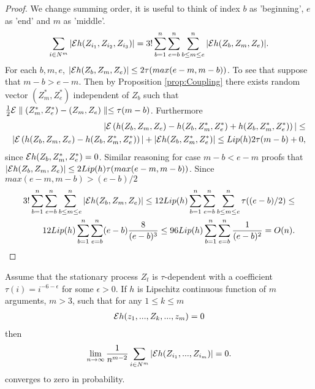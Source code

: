 \begin{proof}
We change summing order, it is useful to think of index $b$ as 'beginning', $e$ as 'end' and $m$ as 'middle'. 
 \begin{align}
 \label{eq:143}
 \sum_{i \in N^{m}} |\mathcal{E}   h(Z_{i_1},Z_{i_2},Z_{i_3})| =  3! \sum_{b=1}^n \sum_{e=b}^n \sum_{b \leq m \leq e }^n |\mathcal{E}   h(Z_b,Z_m,Z_e)|.
\end{align}
For each $b,m,e$, $|\mathcal{E}   h(Z_b,Z_m,Z_e)| \leq 2 \tau(max(e-m,m-b))$. To see that suppose that $m-b>e-m$. Then by Proposition \ref{prop:Coupling} there exists random vector $(Z_m^*,Z_e^*)$ independent of $Z_b$ such that $\frac 1 2 \mathcal{E} \parallel (Z_m^*,Z_e^*) - (Z_m,Z_e) \parallel \leq \tau(m-b)$. Furthermore 
\begin{align}
 |\mathcal{E}   \left(   h(Z_b,Z_m,Z_e) -  h(Z_b,Z_m^*,Z_e^*) + h(Z_b,Z_m^*,Z_e^*) \right) | \leq  \\
 |\mathcal{E}   \left(   h(Z_b,Z_m,Z_e) -  h(Z_b,Z_m^*,Z_e^*) \right) |+ |\mathcal{E} h(Z_b,Z_m^*,Z_e^*) | \leq Lip(h) 2\tau(m-b) +0, 
\end{align}
since $\mathcal{E} h(Z_b,Z_m^*,Z_e^*)=0$. Similar reasoning for case $m-b<e-m$ proofs that $|\mathcal{E} h(Z_b,Z_m,Z_e)| \leq 2 Lip(h) \tau(max(e-m,m-b))$. Since $max(e-m,m-b)>(e-b)/2$   
\begin{align}
3! \sum_{b=1}^n \sum_{e=b}^n \sum_{b \leq m \leq e }^n |\mathcal{E} h(Z_b,Z_m,Z_e)| \leq 12 Lip(h) \sum_{b=1}^n \sum_{e=b}^n \sum_{b \leq m \leq e }^n \tau((e-b)/2) \leq  \\ 
12 Lip(h) \sum_{b=1}^n \sum_{e=b}^n (e-b) \frac{8} {(e-b)^3} \leq 96 Lip(h) \sum_{b=1}^n \sum_{e=b}^n \frac{1} {(e-b)^2} = O(n).
\end{align}
\end{proof}


\begin{lemma}
\label{lem:missingBit}
Assume that the stationary process $Z_t$ is $\tau$-dependent with a coefficient $\tau(i) = i^{-6-\epsilon}$ for some $\epsilon>0$. If $h$ is Lipschitz continuous function of $m$ arguments, $m>3$, such that for any $1 \leq k \leq m$
\begin{align}
\label{eq:assumptionCanonical}
\mathcal{E} h(z_1,...,Z_k,...,z_m) =0
\end{align}
then
\begin{align}
 \lim_{n \to \infty} \frac{1}{n^{m-2}} \sum_{i \in N^{m}} |\mathcal{E}   h(Z_{i_1},...,Z_{i_m})| =0.
\end{align}
converges to zero in probability.
\end{lemma}

